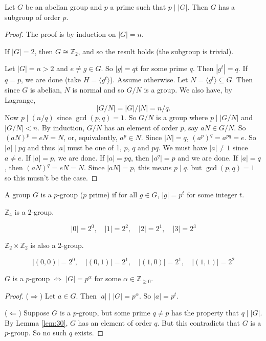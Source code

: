 \begin{lemma}\label{lem:30}
	Let $G$ be an abelian group and $p$ a prime such that $p\mid |G|$. Then $G$ has a subgroup of order $p$.
\end{lemma}

\begin{proof}
	The proof is by induction on $|G|=n$.

	If $|G|=2$, then $G\cong\mathbb Z_2$, and so the result holds (the subgroup is trivial).

	Let $|G|=n>2$ and $e\neq g\in G$. So $|g|=qt$ for some prime $q$. Then $|g^t|=q$. If $q=p$, we are done (take $H=\langle g^t\rangle$). Assume otherwise. Let $N=\langle g^t\rangle\subseteq G$. Then since $G$ is abelian, $N$ is normal and so $G/N$ is a group. We also have, by Lagrange,
	$$|G/N|=|G|/|N|=n/q.$$
	Now $p\mid (n/q)$ since $\gcd(p,q)=1$. So $G/N$ is a group where $p\mid |G/N|$ and $|G/N|<n$. By induction, $G/N$ has an element of order $p$, say $aN\in G/N$. So $(aN)^p=eN=N$, or, equivalently, $a^p\in N$. Since $|N|=q$, $(a^p)^q=a^{pq}=e$. So $|a|\mid pq$ and thus $|a|$ must be one of 1, $p$, $q$ and $pq$. We must have $|a|\neq 1$ since $a\neq e$. If $|a|=p$, we are done. If $|a|=pq$, then $|a^q|=p$ and we are done. If $|a|=q$, then $(aN)^q=eN=N$. Since $|aN|=p$, this means $p\mid q$. but $\gcd(p,q)=1$ so this musn't be the case.
\end{proof}

\begin{definition}
	A group $G$ is a $p$-group ($p$ prime) if for all $g\in G$, $|g|=p^t$ for some integer $t$.
\end{definition}

\begin{example}
	$\mathbb Z_4$ is a 2-group.

	$$|0|=2^0,\quad |1|=2^2,\quad |2|=2^1,\quad |3|=2^3$$

	$\mathbb Z_2\times\mathbb Z_2$ is also a 2-group.

	$$|(0,0)|=2^0,\quad |(0,1)|=2^1,\quad |(1,0)|=2^1,\quad |(1,1)|=2^2$$
\end{example}

\begin{lemma}
	$G$ is a $p$-group $\Longleftrightarrow$ $|G|=p^\alpha$ for some $\alpha\in\mathbb Z_{\geq 0}$.
\end{lemma}

\begin{proof}
	($\Rightarrow$) Let $a\in G$. Then $|a|\mid|G|=p^\alpha$. So $|a|=p^t$.

	($\Leftarrow$) Suppose $G$ is a $p$-group, but some prime $q\neq p$ has the property that $q\mid|G|$. By Lemma \ref{lem:30}, $G$ has an element of order $q$. But this contradicts that $G$ is a $p$-group. So no such $q$ exists.
\end{proof}

